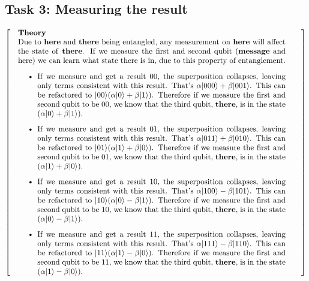\documentclass[a4paper]{article}
\begin{document}
\subsection{Task 3: Measuring the result}
\[
  \left[
      \begin{tabular}{@{\quad}m{\textwidth}@{\qquad}m{\textwidth}@{\quad}}
          \textbf{Theory} \par
Due to \textbf{here} and \textbf{there} being entangled, any measurement on \textbf{here} will affect the state of \textbf{there}. If we measure the first and second qubit (\textbf{message} and here) we can learn what state there is in, due to this property of entanglement.\\
\begin{itemize}
\item If we measure and get a result 00, the superposition collapses, leaving only terms consistent with this result. That's $\alpha|000\rangle +\beta|001\rangle$. This can be refactored to $|00\rangle(\alpha|0\rangle +\beta|1\rangle)$. Therefore if we measure the first and second qubit to be 00, we know that the third qubit, \textbf{there}, is in the state $(\alpha|0\rangle +\beta|1\rangle)$.
\item If we measure and get a result 01, the superposition collapses, leaving only terms consistent with this result. That's $\alpha|011\rangle +\beta|010\rangle$. This can be refactored to $|01\rangle(\alpha|1\rangle +\beta|0\rangle)$. Therefore if we measure the first and second qubit to be 01, we know that the third qubit, \textbf{there}, is in the state $(\alpha|1\rangle +\beta|0\rangle)$.
\item If we measure and get a result 10, the superposition collapses, leaving only terms consistent with this result. That's $\alpha|100\rangle -\beta|101\rangle$. This can be refactored to $|10\rangle(\alpha|0\rangle -\beta|1\rangle)$. Therefore if we measure the first and second qubit to be 10, we know that the third qubit, \textbf{there}, is in the state $(\alpha|0\rangle -\beta|1\rangle)$.
\item If we measure and get a result 11, the superposition collapses, leaving only terms consistent with this result. That's $\alpha|111\rangle -\beta|110\rangle$. This can be refactored to $|11\rangle(\alpha|1\rangle -\beta|0\rangle)$. Therefore if we measure the first and second qubit to be 11, we know that the third qubit, \textbf{there}, is in the state $(\alpha|1\rangle -\beta|0\rangle)$.
\end{itemize}
%
      \end{tabular}
    \right]
\]\\
\end{document}
